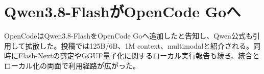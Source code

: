 \section{Qwen3.8-FlashがOpenCode Goへ}
OpenCodeはQwen3.8-FlashをOpenCode Goへ追加したと告知し、Qwen公式も引用して拡散した。投稿では125B/6B、1M context、multimodalと紹介される。同時にFlash-Nextの剪定やGGUF量子化に関するローカル実行報告も続き、統合とローカル化の両面で利用経路が広がった。
